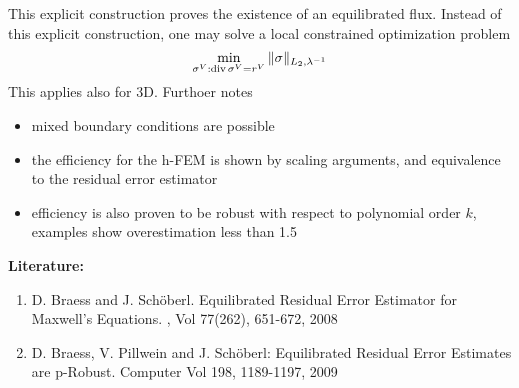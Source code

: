This explicit construction proves the existence of an equilibrated flux. Instead of this explicit construction, one may solve a local constrained optimization problem
$$
\min_{\sigma^V : \operatorname{div} \sigma^V = r^V} \| \sigma \|_{L_2, \lambda^{-1}}
$$
This applies also for 3D. Furthoer notes
\begin{itemize}
\item mixed boundary conditions are possible
\item the efficiency for the h-FEM is shown by scaling arguments, and equivalence to the residual error estimator
\item efficiency is also proven to be robust with respect to polynomial order $k$, examples show overestimation less than 1.5
\end{itemize}


\bigskip \noindent 
{\bf Literature:}
\begin{enumerate}
\item 
D. Braess and J. Sch\"oberl.
\newblock  Equilibrated Residual Error Estimator for Maxwell's
Equations.
, Vol 77(262), 651-672, 2008
\item 
D. Braess, V. Pillwein and J. Sch\"oberl: 
\newblock Equilibrated Residual Error Estimates are p-Robust. Computer
 Vol 198,
1189-1197, 2009
\end{enumerate}



% 